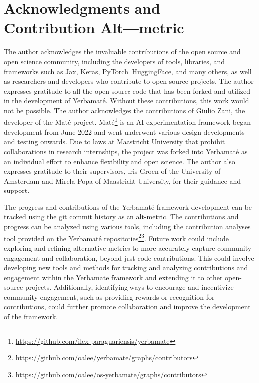 

\section{Acknowledgments and Contribution Alt---metric}

The author acknowledges the invaluable contributions of the open source and open science community, including the developers of tools, libraries, and frameworks such as Jax, Keras, PyTorch, HuggingFace, and many others, as well as researchers and developers who contribute to open source projects. The author expresses gratitude to all the open source code that has been forked and utilized in the development of Yerbamaté. Without these contributions, this work would not be possible.
The author acknowledges the contributions of Giulio Zani, the developer of the Maté project. Maté\footnote{\url{https://github.com/ilex-paraguariensis/yerbamate}} is an AI experimentation framework began development from June 2022 and went underwent various design developments and testing onwards. Due to laws at Maastricht University that prohibit collaborations in research internships, the project was forked into Yerbamaté as an individual effort to enhance flexibility and open science. 
The author also expresses gratitude to their supervisors, Iris Groen of the University of Amsterdam and Mirela Popa of Maastricht University, for their guidance and support. 

The progress and contributions of the Yerbamaté framework development can be tracked using the git commit history as an alt-metric. The contributions and progress can be analyzed using various tools, including the contribution analyses tool provided on the Yerbamaté repositories\footnote{\url{https://github.com/oalee/yerbamate/graphs/contributors}}\footnote{\url{https://github.com/oalee/os-yerbamate/graphs/contributors}}. Future work could include exploring and refining alternative metrics to more accurately capture community engagement and collaboration, beyond just code contributions. This could involve developing new tools and methods for tracking and analyzing contributions and engagement within the Yerbamate framework and extending it to other open-source projects. Additionally, identifying ways to encourage and incentivize community engagement, such as providing rewards or recognition for contributions, could further promote collaboration and improve the development of the framework.


